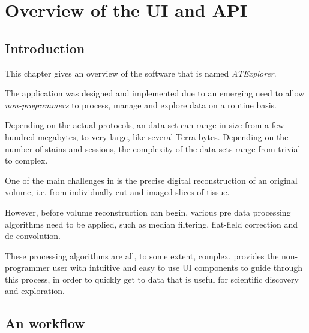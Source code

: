 
\chapter{Overview of the \ate{} UI and API}
\section{Introduction}

\doublespacing
This chapter gives an overview of the software that is named \emph{ATExplorer}.

The \ate application was designed and implemented due to an emerging need to allow \emph{non-programmers} to process, manage and explore \at data on a routine basis.

Depending on the actual protocols, an \at data set can range in size from a few hundred megabytes, to very large, like several Terra bytes.  Depending on the number of stains and sessions, the complexity of the data-sets range from trivial to complex.

One of the main challenges in \at is the precise digital reconstruction of an original volume, i.e. from individually cut and imaged slices of tissue.

However, before volume reconstruction can begin, various pre data processing algorithms need to be applied, such as median filtering, flat-field correction and de-convolution.

These processing algorithms are all, to some extent, complex. \ate provides the non-programmer user with intuitive and easy to use UI components to guide through this process, in order to quickly get to data that is useful for scientific discovery and exploration.

\section{An \at workflow}
\begin{description}[font=$\bullet$~\normalfont\scshape\color{red!50!black}]
\item [Median calculation]
\item [FlatField correction]
\item [Deconvolution]
\item [Stitching]
\item [Registration]
\item [Rough aligning] 
\item [Fine aligning] 
\item [Other]
\end{description}

